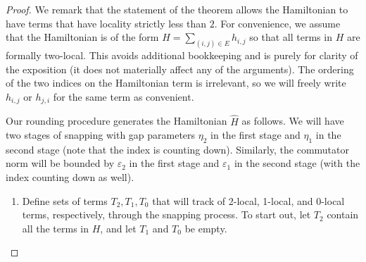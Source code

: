 \documentclass[11pt]{article}
\theoremstyle{plain}
\newcommand{\eps}{\varepsilon}
\begin{document}
\begin{proof}
We remark that the statement of the theorem allows the Hamiltonian to have terms that have locality strictly less than $2$. For convenience, we assume that the Hamiltonian is of the form $H = \sum_{(i,j) \in E} h_{i,j}$ so that all terms in $H$ are formally two-local. This avoids additional bookkeeping and is purely for clarity of the exposition (it does not materially affect any of the arguments). The ordering of the two indices on the Hamiltonian term is irrelevant, so we will freely write $h_{i,j}$ or $h_{j,i}$ for the same term as convenient.

Our rounding procedure generates the Hamiltonian $\hat{H}$ as follows. We will have two stages of snapping with gap parameters $\eta_2$ in the first stage and $\eta_1$ in the second stage (note that the index is counting down). Similarly, the commutator norm will be bounded by $\eps_2$ in the first stage and $\eps_1$ in the second stage (with the index counting down as well).

\begin{enumerate}

    \item Define sets of terms $T_2, T_1, T_0$ that will track of 2-local, 1-local, and 0-local terms, respectively, through the snapping process. To start out, let $T_2$ contain all the terms in $H$, and let $T_1$ and $T_0$ be empty.
    

\end{enumerate}
\end{proof}
\end{document}
